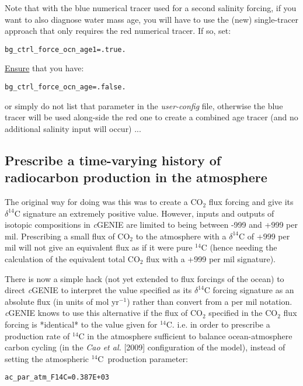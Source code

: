 \documentclass[11pt,fleqn]{book} %
\begin{document}
Note that with the blue numerical tracer used for a second salinity forcing, if you want to also diagnose water mass age, you will have to use the (new) single-tracer approach that only requires the red numerical tracer. If so, set:
\vspace{-2pt}\small\begin{verbatim}
bg_ctrl_force_ocn_age1=.true.
\end{verbatim}\normalsize\vspace{-2pt}
\uline{Ensure} that you have:
\vspace{-2pt}\small\begin{verbatim}
bg_ctrl_force_ocn_age=.false.
\end{verbatim}\normalsize\vspace{-2pt}
or simply do not list that parameter in the \textit{user-config} file, otherwise the blue tracer will be used along-side the red one to create a combined age tracer (and no additional salinity input will occur) ...

%
\newpage
\subsection*{Prescribe a time-varying history of radiocarbon production in the atmosphere}
\vspace{1mm}

The original way for doing was this was to create a CO\(_{2}\) flux forcing and give its \(\delta^{14}\)C signature an extremely positive value. However, inputs and outputs of isotopic compositions in \textit{c}GENIE are limited to being between -999 and +999 per mil. Prescribing a small flux of CO\(_{2}\) to the atmosphere with a \(\delta^{14}\)C of +999 per mil will not give an equivalent flux as if it were pure \(^{14}\)C (hence needing the calculation of the equivalent total CO\(_{2}\) flux with a +999 per mil signature).

There is now a simple hack (not yet extended to flux forcings of the ocean) to direct \textit{c}GENIE to interpret the value specified as its \(\delta^{14}\)C forcing signature as an absolute flux (in units of mol yr\(^{-1}\)) rather than convert from a per mil notation. \textit{c}GENIE knows to use this alternative if the flux of CO\(_{2}\) specified in the CO\(_{2}\) flux forcing is *identical* to the value given for \(^{14}\)C. i.e. in order to prescribe a production rate of \(^{14}\)C in the atmosphere sufficient to balance ocean-atmosphere carbon cycling (in the \textit{Cao et al.} [2009] configuration of the model), instead of setting the atmospheric \(^{14}\)C\ production parameter:
\vspace{-2mm}\small\begin{verbatim}
ac_par_atm_F14C=0.387E+03
\end{verbatim}\normalsize\vspace{-2mm}
\end{document}
